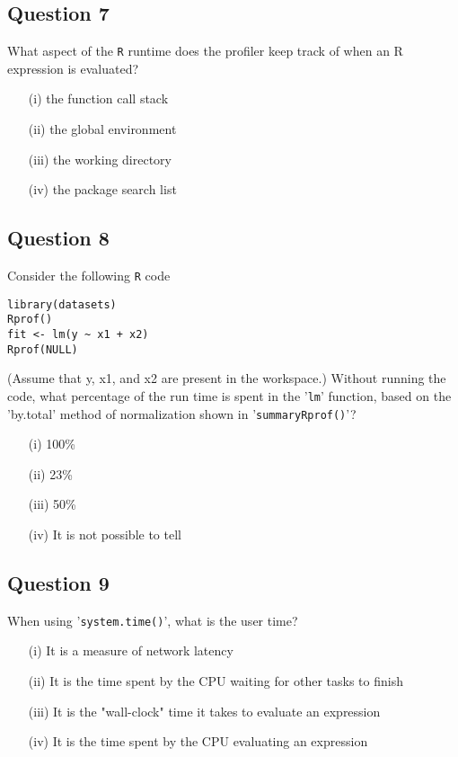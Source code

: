 \documentclass[11pt]{article} %
\begin{document}
\subsection*{Question 7}
What aspect of the \texttt{R} runtime does the profiler keep track of when an R expression is evaluated?

\begin{itemize}
\item[(i)] the function call stack
\item[(ii)] the global environment
\item[(iii)] the working directory
\item[(iv)] the package search list
\end{itemize}
\newpage
\subsection*{Question 8}
Consider the following \texttt{R} code
\begin{framed}
\begin{verbatim}
library(datasets)
Rprof()
fit <- lm(y ~ x1 + x2)
Rprof(NULL)
\end{verbatim}
\end{framed}
(Assume that y, x1, and x2 are present in the workspace.) Without running the code, what percentage of the run time is spent in the '\texttt{lm}' function, based on the 'by.total' method of normalization shown in '\texttt{summaryRprof()}'?

\begin{itemize}
\item[(i)] 100\%
\item[(ii)] 23\%
\item[(iii)] 50\%
\item[(iv)] It is not possible to tell
\end{itemize}
\newpage
\subsection*{Question 9}
When using '\texttt{system.time()}', what is the user time?

\begin{itemize}
\item[(i)] It is a measure of network latency
\item[(ii)] It is the time spent by the CPU waiting for other tasks to finish
\item[(iii)] It is the "wall-clock" time it takes to evaluate an expression
\item[(iv)] It is the time spent by the CPU evaluating an expression
\end{itemize}
\end{document}
